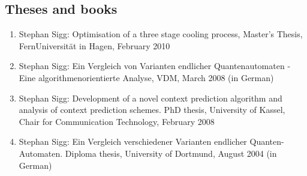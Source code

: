\documentclass[12pt]{article}
\newcounter{saveenumi}
\begin{document}
\subsection*{Theses and books}
\begin{enumerate}
\setcounter{enumi}{\value{saveenumi}}
\item Stephan Sigg: Optimisation of a three stage cooling process, Master's Thesis, FernUniversität in Hagen, February 2010
\item Stephan Sigg: Ein Vergleich von Varianten endlicher Quantenautomaten - Eine algorithmenorientierte Analyse, VDM, March 2008 (in German)
\item Stephan Sigg: Development of a novel context prediction algorithm and analysis of context prediction schemes. PhD thesis, University of Kassel, Chair for Communication Technology, February 2008
\item Stephan Sigg: Ein Vergleich verschiedener Varianten endlicher Quanten-Automaten. Diploma thesis, University of Dortmund, August 2004 (in German)
\end{enumerate}


\label{MaxSeitenzahl}
\end{document}
